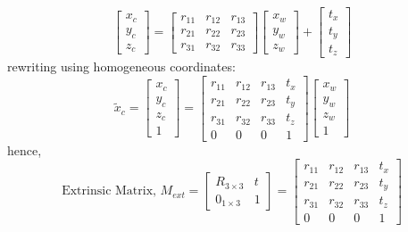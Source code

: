 \[
	\begin{bmatrix} x_c \\ y_c \\ z_c \end{bmatrix} =
	\begin{bmatrix} r_{11} & r_{12} & r_{13} \\ r_{21} & r_{22} & r_{23} \\ r_{31} & r_{32} & r_{33} \end{bmatrix}
	\begin{bmatrix} x_w \\ y_w \\ z_w \end{bmatrix} +
	\begin{bmatrix} t_x \\ t_y \\ t_z \end{bmatrix}
\]
rewriting using homogeneous coordinates:
\[
	\tilde{x}_c = \begin{bmatrix}
		x_c \\
		y_c \\
		z_c \\
		1
	\end{bmatrix} =
	\begin{bmatrix}
		r_{11} & r_{12} & r_{13} & t_x \\
		r_{21} & r_{22} & r_{23} & t_y \\
		r_{31} & r_{32} & r_{33} & t_z \\
		0      & 0      & 0      & 1
	\end{bmatrix}
	\begin{bmatrix}
		x_w \\
		y_w \\
		z_w \\
		1
	\end{bmatrix}
\]
hence,
\[
	\text{Extrinsic Matrix, } M_{ext} = \begin{bmatrix}
		R_{3\times3} & t \\
		0_{1\times3} & 1
	\end{bmatrix} =
	\begin{bmatrix}
		r_{11} & r_{12} & r_{13} & t_x \\
		r_{21} & r_{22} & r_{23} & t_y \\
		r_{31} & r_{32} & r_{33} & t_z \\
		0      & 0      & 0      & 1
	\end{bmatrix}
\]

